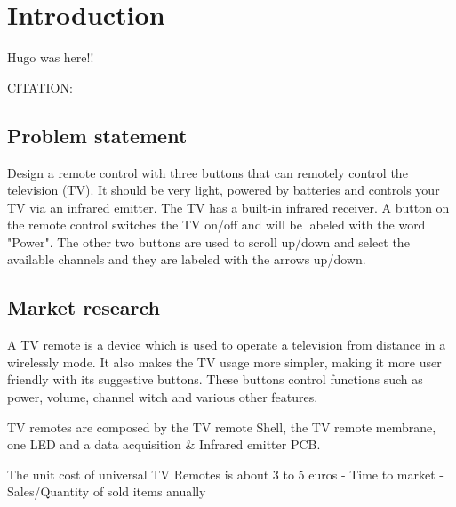 %
%
%
\chapter{Introduction}%
\label{ch:introduction}
Hugo was here!!

CITATION:~\cite{sommerville2011software}

\section{Problem statement}
\label{sec:prob-stat}
    Design a remote control with three buttons that can
remotely control the television (TV). It should be very
light, powered by batteries and controls your TV via an
infrared emitter. The TV has a built-in infrared receiver. A
button on the remote control switches the TV on/off and
will be labeled with the word "Power". The other two
buttons are used to scroll up/down and select the available
channels and they are labeled with the arrows up/down.

\section{Market research}
\label{sec:market-research}
A TV remote is a device which is used to operate a television from distance in a wirelessly mode. It also makes the TV usage more simpler, making it more user friendly with its suggestive buttons. These buttons control functions such as power, volume, channel witch and various other features.

TV remotes are composed by the TV remote Shell,
the TV remote membrane, one LED and a data acquisition \& Infrared emitter PCB.

The unit cost of universal TV Remotes is about 3 to 5 euros
- Time to market
- Sales/Quantity of sold items anually

%
